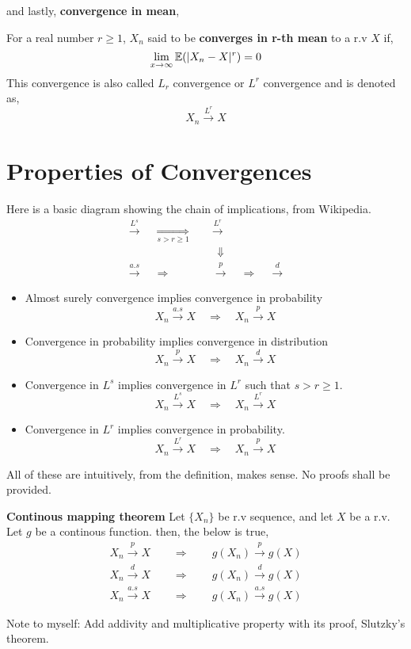 and lastly, \textbf{convergence in mean},
\begin{definition}
    For  a real number $r \ge 1$, $X_n$ said to be \textbf{converges in r-th mean} to a r.v $X$ if, 
    \[\lim_{x \rightarrow \infty} {\mathbb{E}}(|X_n - X|^r) = 0 \]
    This convergence is also called $L_r$ convergence or $L^r$ convergence and is denoted as,
    \[ X_n  \stackrel{L^{r}}{\rightarrow} X \]
\end{definition}

\section{Properties of Convergences}
Here is a basic diagram showing the chain of implications, from Wikipedia.
\begin{align*}
    \stackrel{L^{s}}{\longrightarrow} \quad \underset{s>r\ge 1}{\Rightarrow} \quad &\stackrel{L^{r}}{\longrightarrow} \\
    & \ \  \Downarrow \\
    \stackrel{a.s}{\longrightarrow} \quad  \Rightarrow \quad &\stackrel{p}{\longrightarrow} \quad \Rightarrow \quad \stackrel{d}{\longrightarrow}
\end{align*}

\begin{itemize}
    \item Almost surely convergence implies convergence in probability
        \[ X_n \stackrel{a.s}{\longrightarrow} X\quad \Rightarrow \quad X_n \stackrel{p}{\longrightarrow} X\]
    \item Convergence in probability implies convergence in distribution
        \[ X_n \stackrel{p}{\longrightarrow} X \quad \Rightarrow  \quad X_n  \stackrel{d}{\longrightarrow} X\]
    \item Convergence in $L^s$ implies convergence in $L^r$ such that $s > r \ge 1$.
        \[ X_n \stackrel{L^s}{\longrightarrow} X \quad \Rightarrow \quad X_n \stackrel{L^r}{\longrightarrow} X\]
    \item Convergence in $L^r$ implies convergence in probability.
        \[ X_n \stackrel{L^r}{\longrightarrow} X \quad \Rightarrow \quad  X_n \stackrel{p}{\longrightarrow} X\]
\end{itemize}
All of these are intuitively, from the definition, makes sense. No proofs shall be provided.
\begin{theorem} \textbf{Continous mapping theorem} Let $\{ X_n \}$ be r.v sequence, and let $X$ be a r.v. Let $g$ be a continous function. then, the below is true,
    \begin{align*}
        X_n \stackrel{p}{\longrightarrow} X \qquad \Rightarrow \qquad g(X_n)\stackrel{p}{\longrightarrow} g(X) \\
        X_n \stackrel{d}{\longrightarrow} X \qquad \Rightarrow \qquad g(X_n) \stackrel{d}{\longrightarrow} g(X) \\
        X_n \stackrel{a.s}{\longrightarrow} X \qquad \Rightarrow \qquad g(X_n) \stackrel{a.s}{\longrightarrow} g(X)
    \end{align*}
\end{theorem}
Note to myself: Add addivity and multiplicative property with its proof, Slutzky's theorem.
